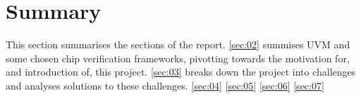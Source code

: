 \section{Summary}\label{sec:01}
This section summarises the sections of the report.\newline
\cref{sec:02} summises UVM and some chosen chip verification frameworks, pivotting towards the motivation for, and introduction of, this project.\newline
\cref{sec:03} breaks down the project into challenges and analyses solutions to these challenges.\newline
\cref{sec:04}
\cref{sec:05}
\cref{sec:06}
\cref{sec:07}
